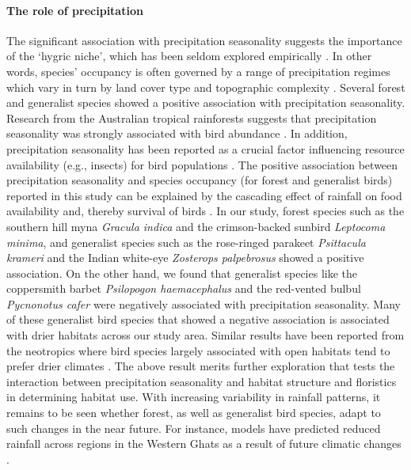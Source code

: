 \paragraph*{The role of precipitation}

The significant association with precipitation seasonality suggests the importance of the `hygric niche', which has been seldom explored empirically \citep{boyle2020}.
In other words, species' occupancy is often governed by a range of precipitation regimes which vary in turn by land cover type and topographic complexity \citep{nowakowski2018}.
Several forest and generalist species showed a positive association with precipitation seasonality.
Research from the Australian tropical rainforests suggests that precipitation seasonality was strongly associated with bird abundance \citep{williams2008}.
In addition, precipitation seasonality has been reported as a crucial factor influencing resource availability (e.g., insects) for bird populations \citep{loiselle1991}.
The positive association between precipitation seasonality and species occupancy (for forest and generalist birds) reported in this study can be explained by the cascading effect of rainfall on food availability and, thereby survival of birds \citep{butt2015,boyle2020}.
In our study, forest species such as the southern hill myna \textit{Gracula indica} and the crimson-backed sunbird \textit{Leptocoma minima}, and generalist species such as the rose-ringed parakeet \textit{Psittacula krameri} and the Indian white-eye \textit{Zosterops palpebrosus} showed a positive association.
On the other hand, we found that generalist species like the coppersmith barbet \textit{Psilopogon haemacephalus} and the red-vented bulbul \textit{Pycnonotus cafer} were negatively associated with precipitation seasonality.
Many of these generalist bird species that showed a negative association is associated with drier habitats across our study area.
Similar results have been reported from the neotropics where bird species largely associated with open habitats tend to prefer drier climates \citep{frishkoff2016}.
The above result merits further exploration that tests the interaction between precipitation seasonality and habitat structure and floristics in determining habitat use.
With increasing variability in rainfall patterns, it remains to be seen whether forest, as well as generalist bird species, adapt to such changes in the near future.
For instance, models have predicted reduced rainfall across regions in the Western Ghats as a result of future climatic changes \citep{rajendran2012}.

